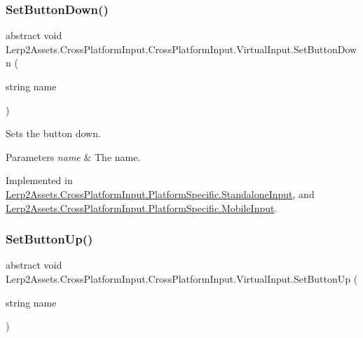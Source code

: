\subsubsection{\texorpdfstring{Set\+Button\+Down()}{SetButtonDown()}}
{\footnotesize\ttfamily abstract void Lerp2\+Assets.\+Cross\+Platform\+Input.\+Cross\+Platform\+Input.\+Virtual\+Input.\+Set\+Button\+Down (\begin{DoxyParamCaption}\item[{string}]{name }\end{DoxyParamCaption})\hspace{0.3cm}{\ttfamily [pure virtual]}}



Sets the button down. 


\begin{DoxyParams}{Parameters}
{\em name} & The name.\\
\hline
\end{DoxyParams}


Implemented in \hyperlink{class_lerp2_assets_1_1_cross_platform_input_1_1_platform_specific_1_1_standalone_input_a13ea072e40caff4862a5db57c90b3f74}{Lerp2\+Assets.\+Cross\+Platform\+Input.\+Platform\+Specific.\+Standalone\+Input}, and \hyperlink{class_lerp2_assets_1_1_cross_platform_input_1_1_platform_specific_1_1_mobile_input_a1d57171c20c7f519f053bbc87a573f03}{Lerp2\+Assets.\+Cross\+Platform\+Input.\+Platform\+Specific.\+Mobile\+Input}.

\mbox{\label{class_lerp2_assets_1_1_cross_platform_input_1_1_cross_platform_input_1_1_virtual_input_ae813c350c71501f35ed2aefa375b233c}} 
\subsubsection{\texorpdfstring{Set\+Button\+Up()}{SetButtonUp()}}
{\footnotesize\ttfamily abstract void Lerp2\+Assets.\+Cross\+Platform\+Input.\+Cross\+Platform\+Input.\+Virtual\+Input.\+Set\+Button\+Up (\begin{DoxyParamCaption}\item[{string}]{name }\end{DoxyParamCaption})\hspace{0.3cm}{\ttfamily [pure virtual]}}



